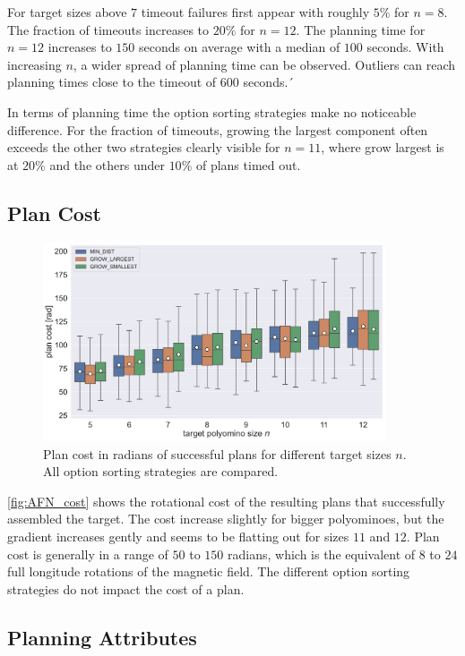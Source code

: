 For target sizes above $7$ timeout failures first appear with roughly $5\%$ for $n = 8$.
The fraction of timeouts increases to $20\%$ for $n=12$.
The planning time for $n = 12$ increases to $150$ seconds on average with a median of $100$ seconds.
With increasing $n$, a wider spread of planning time can be observed.
Outliers can reach planning times close to the timeout of $600$ seconds.´

In terms of planning time the option sorting strategies make no noticeable difference.
For the fraction of timeouts, growing the largest component often exceeds the other two strategies clearly visible for $n=11$, where grow largest is at $20\%$ and the others under $10\%$ of plans timed out.


\subsection{Plan Cost}

\begin{figure}
	\centering
	\includegraphics[width=0.9\textwidth]{figures/plots/AFN_cost.pdf}
	\caption[Plan cost for different target sizes]{Plan cost in radians of successful plans for different target sizes $n$. All option sorting strategies are compared.}
	\label{fig:AFN_cost}
\end{figure}

\autoref{fig:AFN_cost} shows the rotational cost of the resulting plans that successfully assembled the target.
The cost increase slightly for bigger polyominoes, but the gradient increases gently and seems to be flatting out for sizes $11$ and $12$.
Plan cost is generally in a range of $50$ to $150$ radians, which is the equivalent of $8$ to $24$ full longitude rotations of the magnetic field.
The different option sorting strategies do not impact the cost of a plan.

\subsection{Planning Attributes}


